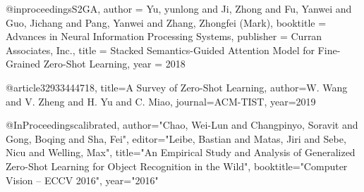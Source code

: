 @inproceedings{S2GA,
 author = {Yu, yunlong and Ji, Zhong and Fu, Yanwei and Guo, Jichang and Pang, Yanwei and Zhang, Zhongfei (Mark)},
 booktitle = {Advances in Neural Information Processing Systems},
 publisher = {Curran Associates, Inc.},
 title = {Stacked Semantics-Guided Attention Model for Fine-Grained Zero-Shot Learning},
 year = {2018}
}




@article{32933444718,
  title={A Survey of Zero-Shot Learning},
  author={W. Wang and V. Zheng and H. Yu and C. Miao},
  journal={ACM-TIST},
  year={2019}
}


@InProceedings{calibrated,
author="Chao, Wei-Lun
and Changpinyo, Soravit
and Gong, Boqing
and Sha, Fei",
editor="Leibe, Bastian
and Matas, Jiri
and Sebe, Nicu
and Welling, Max",
title="An Empirical Study and Analysis of Generalized Zero-Shot Learning for Object Recognition in the Wild",
booktitle="Computer Vision -- ECCV 2016",
year="2016"}

